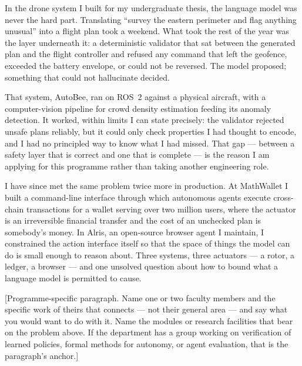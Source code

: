 \documentclass[12pt,single]{statement}
\begin{document}
\statementtitle

In the drone system I built for my undergraduate thesis, the language model
was never the hard part. Translating ``survey the eastern perimeter and flag
anything unusual'' into a flight plan took a weekend. What took the rest of
the year was the layer underneath it: a deterministic validator that sat
between the generated plan and the flight controller and refused any command
that left the geofence, exceeded the battery envelope, or could not be
reversed. The model proposed; something that could not hallucinate decided.

That system, AutoBee, ran on ROS~2 against a physical aircraft, with a
computer-vision pipeline for crowd density estimation feeding its anomaly
detection. It worked, within limits I can state precisely: the validator
rejected unsafe plans reliably, but it could only check properties I had
thought to encode, and I had no principled way to know what I had missed.
That gap --- between a safety layer that is correct and one that is complete
--- is the reason I am applying for this programme rather than taking
another engineering role.

I have since met the same problem twice more in production. At MathWallet I
built a command-line interface through which autonomous agents execute
cross-chain transactions for a wallet serving over two million users, where
the actuator is an irreversible financial transfer and the cost of an
unchecked plan is somebody's money. In Alris, an open-source browser agent I
maintain, I constrained the action interface itself so that the space of
things the model can do is small enough to reason about. Three systems, three
actuators --- a rotor, a ledger, a browser --- and one unsolved question
about how to bound what a language model is permitted to cause.

[Programme-specific paragraph. Name one or two faculty members and the
specific work of theirs that connects --- not their general area --- and say
what you would want to do with it. Name the modules or research facilities
that bear on the problem above. If the department has a group working on
verification of learned policies, formal methods for autonomy, or agent
evaluation, that is the paragraph's anchor.]
\end{document}
